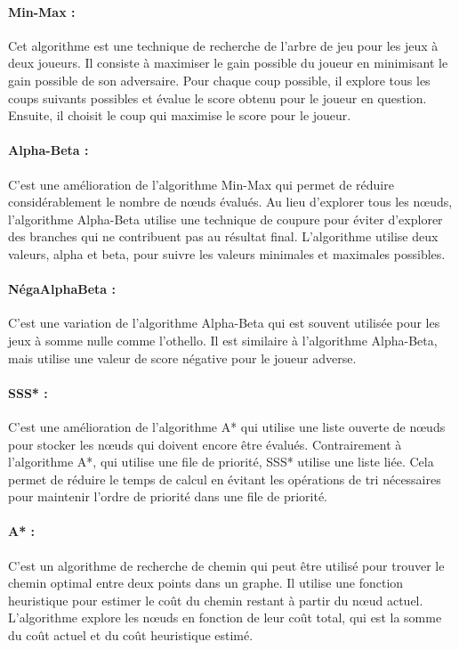 \documentclass[12pt]{article}
\begin{document}
	    \paragraph{Min-Max :} Cet algorithme est une technique de recherche de l'arbre de jeu pour les jeux à deux joueurs. Il consiste à maximiser le gain possible du joueur en minimisant le gain possible de son adversaire. Pour chaque coup possible, il explore tous les coups suivants possibles et évalue le score obtenu pour le joueur en question. Ensuite, il choisit le coup qui maximise le score pour le joueur.
	
	\paragraph{Alpha-Beta :} C'est une amélioration de l'algorithme Min-Max qui permet de réduire considérablement le nombre de nœuds évalués. Au lieu d'explorer tous les nœuds, l'algorithme Alpha-Beta utilise une technique de coupure pour éviter d'explorer des branches qui ne contribuent pas au résultat final. L'algorithme utilise deux valeurs, alpha et beta, pour suivre les valeurs minimales et maximales possibles.
	
		
\paragraph{	NégaAlphaBeta : }C'est une variation de l'algorithme Alpha-Beta qui est souvent utilisée pour les jeux à somme nulle comme l'othello. Il est similaire à l'algorithme Alpha-Beta, mais utilise une valeur de score négative pour le joueur adverse.
	
	\paragraph{SSS* :} C'est une amélioration de l'algorithme A* qui utilise une liste ouverte de nœuds pour stocker les nœuds qui doivent encore être évalués. Contrairement à l'algorithme A*, qui utilise une file de priorité, SSS* utilise une liste liée. Cela permet de réduire le temps de calcul en évitant les opérations de tri nécessaires pour maintenir l'ordre de priorité dans une file de priorité.
	
\paragraph{	A* :} C'est un algorithme de recherche de chemin qui peut être utilisé pour trouver le chemin optimal entre deux points dans un graphe. Il utilise une fonction heuristique pour estimer le coût du chemin restant à partir du nœud actuel. L'algorithme explore les nœuds en fonction de leur coût total, qui est la somme du coût actuel et du coût heuristique estimé.
\end{document}
